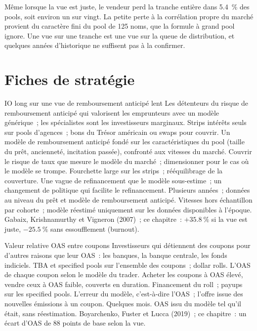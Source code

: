 Même lorsque la vue est juste, le vendeur perd la tranche entière dans 5.4~\% des pools, soit environ un sur vingt. La petite perte à la corrélation propre du marché provient du caractère fini
du pool de 125 noms, que la formule à grand pool ignore. Une vue sur une tranche est une vue sur la queue de distribution, et quelques années d'historique ne suffisent pas à la confirmer.

\section{Fiches de stratégie}

\begin{strategyfile}{IO long sur une vue de remboursement anticipé lent}\label{strat:s2:mortgage-and-structured-credit-strategies:io}
 Les détenteurs du risque de remboursement anticipé qui valorisent les emprunteurs avec un modèle générique~; les spécialistes sont les investisseurs marginaux.
 Strips intérêts seuls sur pools d'agences~; bons du Trésor américain ou swaps pour couvrir.
 Un modèle de remboursement anticipé fondé sur les caractéristiques du pool (taille du prêt, ancienneté, incitation passée), confronté aux vitesses du marché.
 Couvrir le risque de taux que mesure le modèle du marché~; dimensionner pour le cas où le modèle se trompe.
 Fourchette large sur les strips~; rééquilibrage de la couverture.
 Une vague de refinancement que le modèle sous-estime~; un changement de politique qui facilite le refinancement.
 Plusieurs années~; données au niveau du prêt et modèle de remboursement anticipé.
 Vitesses hors échantillon par cohorte~; modèle réestimé uniquement sur les données disponibles à l'époque.
 Gabaix, Krishnamurthy et Vigneron (2007)~; ce chapitre~: $+35.8~\%$ si la vue est juste, $-25.5~\%$ sans essoufflement (burnout).
\end{strategyfile}

\begin{strategyfile}{Valeur relative OAS entre coupons}\label{strat:s2:mortgage-and-structured-credit-strategies:oas}
 Investisseurs qui détiennent des coupons pour d'autres raisons que leur OAS~: les banques, la banque centrale, les fonds indiciels.
 TBA et specified pools sur l'ensemble des coupons~; dollar rolls.
 L'OAS de chaque coupon selon le modèle du trader.
 Acheter les coupons à OAS élevé, vendre ceux à OAS faible, couverts en duration.
 Financement du roll~; payups sur les specified pools.
 L'erreur du modèle, c'est-à-dire l'OAS~; l'offre issue des nouvelles émissions à un coupon.
 Quelques mois.
 OAS issu du modèle tel qu'il était, sans réestimation.
 Boyarchenko, Fuster et Lucca (2019)~; ce chapitre~: un écart d'OAS de 88 points de base selon la vue.
\end{strategyfile}

